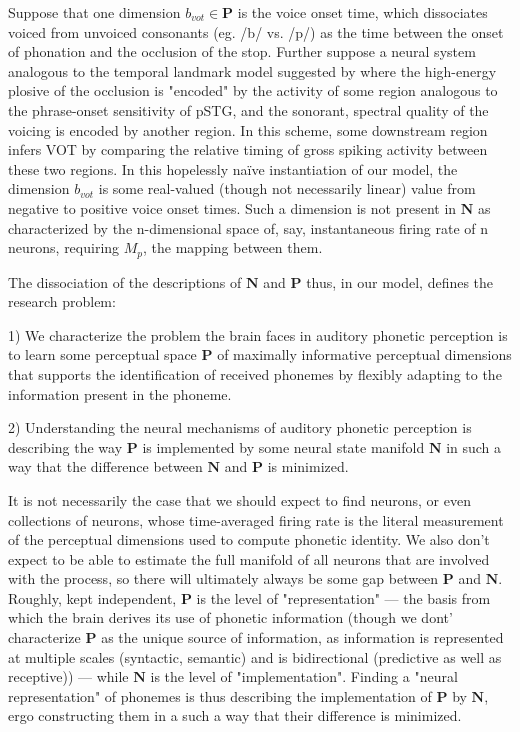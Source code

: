 Suppose that one dimension $b_{vot} \in \mathbf{P}$ is the voice onset time, which dissociates voiced from unvoiced consonants (eg. /b/ vs. /p/) as the time between the onset of phonation and the occlusion of the stop. Further suppose a neural system analogous to the temporal landmark model suggested by \citep{hamiltonSpatialMapOnset2018a} where the high-energy plosive of the occlusion is "encoded" by the activity of some region analogous to the phrase-onset sensitivity of pSTG, and the sonorant, spectral quality of the voicing is encoded by another region. In this scheme, some downstream region  infers VOT by comparing the relative timing of gross spiking activity between these two regions. In this hopelessly na\"ive instantiation of our model, the dimension $b_{vot}$ is some real-valued (though not necessarily linear) value from negative to positive voice onset times. Such a dimension is not present in $\mathbf{N}$ as characterized by the n-dimensional space of, say, instantaneous firing rate of n neurons, requiring $M_p$, the mapping between them. 

The dissociation of the descriptions of $\mathbf{N}$ and $\mathbf{P}$ thus, in our model, defines the research problem: 

1) We characterize the problem the brain faces in auditory phonetic perception is to learn some perceptual space $\mathbf{P}$ of maximally informative perceptual dimensions that supports the identification of received phonemes by flexibly adapting to the information present in the phoneme. 

2) Understanding the neural mechanisms of auditory phonetic perception is describing the way $\mathbf{P}$ is implemented by some neural state manifold $\mathbf{N}$ in such a way that the difference between $\mathbf{N}$ and $\mathbf{P}$ is minimized. 

It is not necessarily the case that we should expect to find neurons, or even collections of neurons, whose time-averaged firing rate is the literal measurement of the perceptual dimensions used to compute phonetic identity. We also don't expect to be able to estimate the full manifold of all neurons that are involved with the process, so there will ultimately always be some gap between $\mathbf{P}$ and $\mathbf{N}$. Roughly, kept independent, $\mathbf{P}$ is the level of "representation" --- the basis from which the brain derives its use of phonetic information (though we dont' characterize $\mathbf{P}$ as the unique source of information, as information is represented at multiple scales (syntactic, semantic) and is bidirectional (predictive as well as receptive)) --- while $\mathbf{N}$ is the level of "implementation". Finding a "neural representation" of phonemes is thus describing the implementation of $\mathbf{P}$ by $\mathbf{N}$, ergo constructing them in a such a way that their difference is minimized. 

